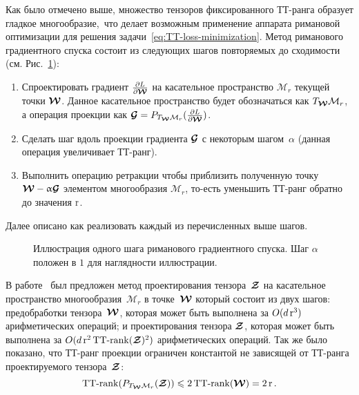 Как было отмечено выше, множество тензоров фиксированного ТТ-ранга образует гладкое многообразие, что делает возможным применение аппарата римановой оптимизации для решения задачи~\eqref{eq:TT-loss-minimization}.
Метод риманового градиентного спуска состоит из следующих шагов повторяемых до сходимости (см. Рис.~\ref{fig:riemannian-illustration}):
\begin{enumerate}
\item Спроектировать градиент $\frac{\partial L}{\partial \boldsymbol{\mathcal{W}}}$ на касательное пространство $\mathcal{M}_r$ текущей точки $\boldsymbol{\mathcal{W}}$. Данное касательное пространство будет обозначаться как $T_{\boldsymbol{\mathcal{W}}} \mathcal{M}_r$, а операция проекции как $\boldsymbol{\mathcal{G}} = P_{T_{\boldsymbol{\mathcal{W}}} \mathcal{M}_r}(\frac{\partial L}{\partial \boldsymbol{\mathcal{W}}})$.
\item Сделать шаг вдоль проекции градиента $\boldsymbol{\mathcal{G}}$ с некоторым шагом~$\alpha$ (данная операция увеличивает ТТ-ранг).
\item Выполнить операцию ретракции чтобы приблизить полученную точку $\boldsymbol{\mathcal{W}} - \upalpha \boldsymbol{\mathcal{G}}$  элементом многообразия $\mathcal{M}_r$, то-есть уменьшить ТТ-ранг обратно до значения $\operatorname{r}$.
\end{enumerate}
Далее описано как реализовать каждый из перечисленных выше шагов.

\begin{figure}[t]
\begin{center}
  \resizebox{0.5\textwidth}{!}{
  \def\svgwidth{7cm}
  \normalsize
  
  }
  \caption{Иллюстрация одного шага риманового градиентного спуска. Шаг $\alpha$ положен в $1$ для наглядности иллюстрации. \label{fig:riemannian-illustration}}
  \end{center}
\end{figure}

В работе~\cite{lubich2015time} был предложен метод проектирования тензора~$\boldsymbol{\mathcal{Z}}$ на касательное пространство многообразия~$\mathcal{M}_r$ в точке~$\boldsymbol{\mathcal{W}}$ который состоит из двух шагов: предобработки тензора~$\boldsymbol{\mathcal{W}}$, которая может быть выполнена за $O(d \operatorname{r}^3)$ арифметических операций; и проектирования тензора $\boldsymbol{\mathcal{Z}}$, которая может быть выполнена за $O(d \operatorname{r}^2 \operatorname{TT-rank}(\boldsymbol{\mathcal{Z}})^2)$ арифметических операций.
Так же было показано, что ТТ-ранг проекции ограничен константой не зависящей от ТТ-ранга проектируемого тензора~$\boldsymbol{\mathcal{Z}}$:
\begin{equation*}
   \operatorname{TT-rank}(P_{T_{\boldsymbol{\mathcal{W}}} \mathcal{M}_r}(\boldsymbol{\mathcal{Z}})) \leqslant 2 \operatorname{TT-rank}(\boldsymbol{\mathcal{W}}) = 2 \operatorname{r}.
\end{equation*}

